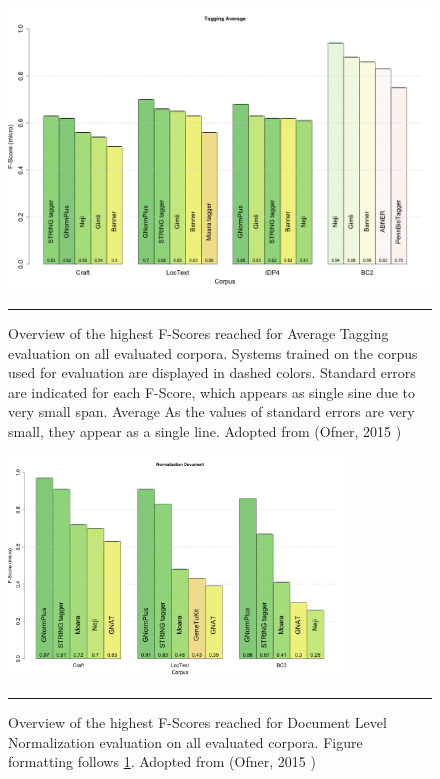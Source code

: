 \begin{figure}[htbp]
	\centering
    \includegraphics[width=5in]{Figures/eval/TaggingAverageOverview.png}
    \rule{35em}{0.5pt}
  \caption[Overview of the highest F-Scores in Average Tagging evaluation]{Overview of the highest F-Scores reached for Average Tagging evaluation on all evaluated corpora. Systems trained on the corpus used for evaluation are displayed in dashed colors. Standard errors are indicated for each F-Score, which appears as single sine due to very small span. Average  As the values of standard errors are very small, they appear as a single line. Adopted from (Ofner, 2015 \citep{ofner2015evaluation})}
  \label{fig:TaggingAverageFScore}
\end{figure}


\begin{figure}[htbp]
	\centering
    \includegraphics[width=3.5in]{Figures/eval/NormalizationDocumentOverview.png}
    \rule{35em}{0.5pt}
  \caption[Overview of the highest F-Scores in Document Level Normalization evaluation]{Overview of the highest F-Scores reached for Document Level Normalization evaluation on all evaluated corpora. Figure formatting follows \ref{fig:TaggingAverageFScore}. Adopted from (Ofner, 2015 \citep{ofner2015evaluation})}
  \label{fig:DocNormalizationFScore}
\end{figure}


